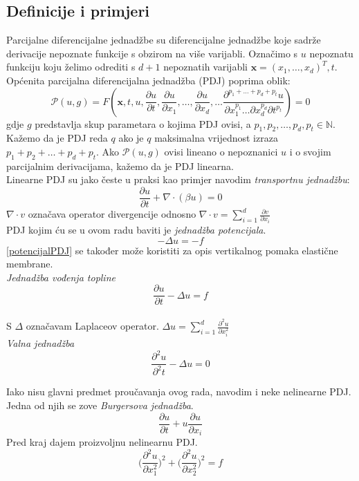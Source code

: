 \documentclass[zavrsnirad]{../fer}
\begin{document}
\subsection{Definicije i primjeri}

Parcijalne diferencijalne jednadžbe su diferencijalne 
jednadžbe koje sadrže derivacije nepoznate funkcije s
obzirom na više varijabli. Označimo s $u$ nepoznatu funkciju
koju želimo odrediti s $d + 1$ nepoznatih varijabli 
$\textbf{x} = (x_1, \dots, x_d)^T, t$. Općenita parcijalna diferencijalna 
jednadžba (PDJ) poprima oblik:
$$\mathcal{P}(u, g) = F(\textbf{x}, t, u,
\frac{\partial u}{\partial t},
\frac{\partial u}{\partial x_1},
\dots,
\frac{\partial u}{\partial x_d},
\dots
\frac{\partial^{p_1 + \dots + p_d + p_t} u} 
{\partial x_1^{p_1}\dots\partial x_d^{p_d} \partial t^{p_t}}
) = 0$$
gdje $g$ predstavlja skup parametara o kojima PDJ ovisi, a 
$p_1, p_2, \dots, p_d, p_t \in \mathbb{N}$. Kažemo da 
je PDJ reda $q$ ako je $q$ maksimalna vrijednost izraza 
$p_1 + p_2 + \dots + p_d + p_t$. 
Ako $\mathcal{P}(u,g)$ ovisi lineano o nepoznanici $u$ 
i o svojim parcijalnim derivacijama, kažemo da je 
PDJ  linearna.
\bigskip
\\ 
Linearne PDJ su jako česte u praksi kao primjer navodim 
\textit{transportnu jednadžbu}:
$$\frac{\partial u}{\partial t} + \nabla \cdot (\beta u) = 0$$
$\nabla \cdot v$ označava operator divergencije odnosno 
$\nabla \cdot v = \sum_{i=1}^d \frac{\partial v}{\partial x_i}$
\bigskip 
\\
PDJ kojim ću se u ovom radu baviti je \textit{jednadžba potencijala}.
\begin{equation}
  \label{potencijalPDJ}
- \Delta u = - f 
\end{equation}
\ref{potencijalPDJ} se također
može koristiti za opis vertikalnog pomaka elastične membrane. 
\bigskip
\\ 
\textit{Jednadžba vođenja topline}
\begin{equation}
  \frac{\partial u}{\partial t} - \Delta u = f
\end{equation}
\bigskip 
\\ 
S $\Delta$ označavam Laplaceov operator.
$\Delta u = \sum_{i = 1}^d \frac{\partial^2 u}{\partial x_i ^2}$ 
\bigskip 
\\
\textit{Valna jednadžba}
\begin{equation}
  \frac{\partial ^2 u}{\partial^2 t} - \Delta u = 0
\end{equation}

Iako nisu glavni predmet proučavanja ovog rada, navodim 
i neke nelinearne PDJ.
Jedna od njih se zove \textit{Burgersova jednadžba}.
$$\frac{\partial u}{\partial t} +
u \frac{\partial u}{\partial x_i}$$
Pred kraj dajem proizvoljnu nelinearnu PDJ. 
$$\Big(\frac{\partial^2 u}{\partial x_1 ^2}\Big)^2 +
\Big(\frac{\partial^2 u}{\partial x_2 ^2}\Big)^2 = f$$
\end{document}
